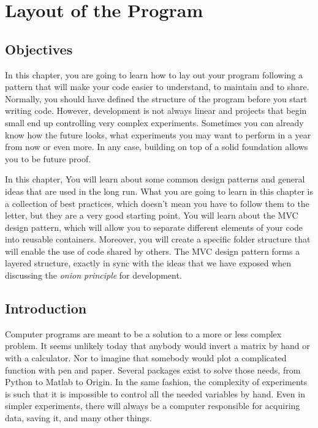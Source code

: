 \chapter{Layout of the Program}\label{layout-of-theprogram}

\section{Objectives}
In this chapter, you are going to learn how to lay out your program
following a pattern that will make your code easier to understand, to
maintain and to share. Normally, you should have defined the structure
of the program before you start writing code. However, development is
not always linear and projects that begin small end up controlling very
complex experiments. Sometimes you can already know how the future
looks, what experiments you may want to perform in a year from now or
even more. In any case, building on top of a solid foundation allows you
to be future proof.

In this chapter, You will learn about some common design patterns and
general ideas that are used in the long run. What you are going to learn
in this chapter is a collection of best practices, which doesn't mean
you have to follow them to the letter, but they are a very good starting
point. You will learn about the {MVC} design pattern, which will allow
you to separate different elements of your code into reusable
containers. Moreover, you will create a specific folder structure that
will enable the use of code shared by others. The {MVC} design pattern forms
a layered structure, exactly in sync with the ideas that we have exposed
when discussing the \emph{onion principle} for development.

\section{Introduction}
Computer programs are meant to be a solution to a more or less complex
problem. It seems unlikely today that anybody would invert a matrix by
hand or with a calculator. Nor to imagine that somebody would plot a
complicated function with pen and paper. Several packages exist to solve
those needs, from Python to Matlab to Origin. In the same fashion, the
complexity of experiments is such that it is impossible to control all
the needed variables by hand. Even in simpler experiments, there will
always be a computer responsible for acquiring data, saving it, and many
other things.


